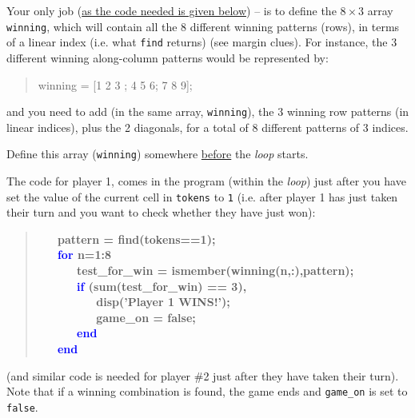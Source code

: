 \documentclass{tufte-book} %
\newenvironment{docspec}{\begin{quotation}\ttfamily\parskip0pt\parindent0pt\ignorespaces}{\end{quotation}}
\newenvironment{docspecbold}{\begin{quotation}\ttfamily\bfseries\parskip0pt\parindent0pt\ignorespaces}{\end{quotation}}
\begin{document}
Your only job (\uline{as the  code needed is given below}) -- is to define the \(8\times 3\) array \texttt{winning}, which will contain all the 8 different winning patterns (rows), in terms of a linear index (i.e. what \texttt{find} returns) (see margin clues).
For instance, the 3 different winning along-column patterns would be represented by:
\begin{docspec}
winning = [1 2 3 ; 4 5 6; 7 8 9];
\end{docspec}
and you need to add (in the same array, \texttt{winning}), the 3 winning row patterns (in linear indices), plus the 2 diagonals, for a total of 8 different patterns of 3 indices.

Define this array (\texttt{winning}) somewhere \uline{before} the \textit{loop} starts.

The code for player 1,  comes in the program (within the \textit{loop}) just after you have set the value of the current cell in \texttt{tokens} to \texttt{1} (i.e. after player 1 has just taken their turn and you want to check whether they have just won):

\begin{docspecbold}
\ \ \             pattern = find(tokens==1);\\
\ \ \             \textcolor{blue}{for} n=1:8\\
\ \ \ \ \ \                 test\_for\_win = ismember(winning(n,:),pattern);\\
\ \ \ \ \ \                 \textcolor{blue}{if} (sum(test\_for\_win) == 3),\\
\ \ \ \ \ \ \ \ \                     disp(\textcolor[rgb]{1,0,1}{'Player 1 WINS!'});\\
\ \ \ \ \ \ \ \ \                     game\_on = false;\\
\ \ \ \ \ \                 \textcolor{blue}{end}\\
\ \ \             \textcolor{blue}{end}
\end{docspecbold}
(and similar code is needed for player \#2 just after they have taken their turn). Note that if a winning combination is found, the game ends and \texttt{game\_on} is set to \texttt{false}.
\end{document}
